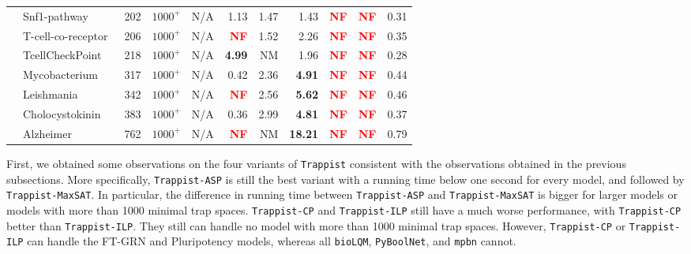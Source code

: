 \documentclass[preprint,12pt]{elsarticle}
\newcounter{rownumber}
\newcommand\rownb{\stepcounter{rownumber}\arabic{rownumber}}
\newcommand{\change}[1]{\textcolor{red}{#1}}
\begin{document}
\begin{table}[!htb]
{\begin{tabular}{rlrrrrrrrrr}
    \midrule %
    \rownb & Snf1-pathway~\cite{Lubitz2015} & 202 & $1000^+$ & N/A & 1.13 & 1.47 & 1.43 & \textbf{\change{NF}} & \textbf{\change{NF}} & 0.31 \\
    \rownb & T-cell-co-receptor~\cite{DesignPrinciplesGeneNetworks} & 206 & $1000^+$ & N/A & \textbf{\change{NF}} & 1.52 & 2.26 & \textbf{\change{NF}} & \textbf{\change{NF}} & 0.35 \\
    \rownb & TcellCheckPoint~\cite{hernandez2020computational} & 218 & $1000^+$ & N/A & \textbf{4.99} & NM & 1.96 & \textbf{\change{NF}} & \textbf{\change{NF}} & 0.28 \\
    \rownb & Mycobacterium~\cite{DesignPrinciplesGeneNetworks} & 317 & $1000^+$ & N/A & 0.42 & 2.36 & \textbf{4.91} & \textbf{\change{NF}} & \textbf{\change{NF}} & 0.44 \\
    \rownb & Leishmania~\cite{DesignPrinciplesGeneNetworks} & 342 & $1000^+$ & N/A & \textbf{\change{NF}} & 2.56 & \textbf{5.62} & \textbf{\change{NF}} & \textbf{\change{NF}} & 0.46 \\
    \rownb & Cholocystokinin~\cite{aghamiri2020automated} & 383 & $1000^+$ & N/A & 0.36 & 2.99 & \textbf{4.81} & \textbf{\change{NF}} & \textbf{\change{NF}} & 0.37 \\
    \rownb & Alzheimer~\cite{aghamiri2020automated} & 762 & $1000^+$ & N/A & \textbf{\change{NF}} & NM & \textbf{18.21} & \textbf{\change{NF}} & \textbf{\change{NF}} & 0.79 \\

    \bottomrule
  \end{tabular}
  }
\end{table}

First, we obtained some observations on the four variants of \texttt{Trappist} consistent with the observations obtained in the previous subsections.
More specifically, \texttt{Trappist-ASP} is still the best variant with a running time below one second for every model, and followed by \texttt{Trappist-MaxSAT}.
In particular, the difference in running time between \texttt{Trappist-ASP} and \texttt{Trappist-MaxSAT} is bigger for larger models or models with more than 1000 minimal trap spaces.
\texttt{Trappist-CP} and \texttt{Trappist-ILP} still have a much worse performance, with \texttt{Trappist-CP} better than \texttt{Trappist-ILP}.
They still can handle no model with more than 1000 minimal trap spaces.
However, \texttt{Trappist-CP} or \texttt{Trappist-ILP} can handle the FT-GRN and Pluripotency models, whereas all \texttt{bioLQM}, \texttt{PyBoolNet}, and \texttt{mpbn} cannot.
\end{document}
